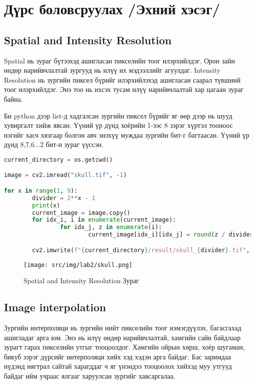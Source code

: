 \chapter{Дүрс боловсруулах /Эхний хэсэг/}
\section{Spatial and Intensity Resolution}

Spatial нь зураг бүтээхэд ашигласан пикселийн тоог илэрхийлдэг. Орон зайн өндөр нарийвчлалтай зургууд нь илүү их мэдээллийг агуулдаг. Intensity Resolution нь зургийн пиксел бүрийг илэрхийлэхэд ашигласан саарал түвшний тоог илэрхийлдэг. Энэ тоо нь ихсэх тусам илүү нарийвчлалтай хар цагаан зураг байна.

Би python дээр list-д хадгалсан зургийн пиксел бүрийг яг өөр дээр нь шууд хувиргалт хийж явсан. Үүний үр дүнд хоёрийн 1-ээс 8 зэрэг хүртэл тооноос нэгийг хасч хязгаар болгон авч энэхүү муждаа зургийн бит-г багтаасан. Үүний үр дүнд 8,7,6...2 бит-н зураг үүссэн.

\begin{lstlisting}[language=Python, caption=Spatial and Intensity Resolution, frame=single]
current_directory = os.getcwd()

image = cv2.imread("skull.tif", -1)

for x in range(1, 9):
		divider = 2**x - 1
		print(x)
		current_image = image.copy()
		for idx_i, i in enumerate(current_image):
				for idx_j, z in enumerate(i):
						current_image[idx_i][idx_j] = round(z / divider) * divider

		cv2.imwrite(f"{current_directory}/result/skull_{divider}.tif", current_image)
\end{lstlisting}

\begin{figure}[h!]
	\centering
	\texttt{[image: src/img/lab2/skull.png]}
	\caption{Spatial and Intensity Resolution Зураг}
\end{figure}
	
\pagebreak

\section{Image interpolation}

Зургийн интерполяци нь зургийн нийт пикселийн тоог нэмэгдүүлэх, багасгахад ашигладаг арга юм. Энэ нь илүү өндөр нарийвчлалтай, хамгийн сайн байдлаар зурагт гарах пикселийн утгыг тооцоолдог. Хамгийн ойрын хөрш, хоёр шугаман, бикуб зэрэг дүрсийг интерполяци хийх хэд хэдэн арга байдаг.
Бас заримдаа нүдэнд нягтрал сайтай харагддаг ч яг үнэндээ тооцоолох хийхэд муу утгууд байдаг ийм учраас ялгааг харуулсан зургийг хавсаргалаа.
